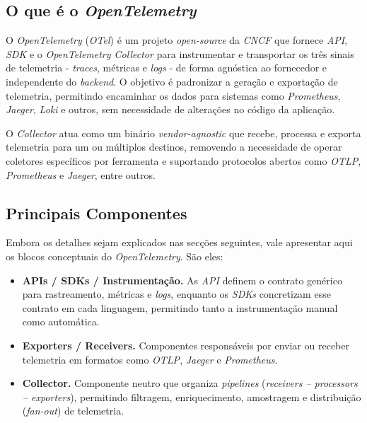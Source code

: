 \subsection{O que é o \textit{OpenTelemetry}}

O \textit{OpenTelemetry} (\textit{OTel}) é um projeto \textit{open-source} da \textit{CNCF} que fornece \textit{API}, \textit{SDK} e o \textit{OpenTelemetry Collector} para instrumentar e transportar os três sinais de telemetria - \textit{traces}, métricas e \textit{logs} - de forma agnóstica ao fornecedor e independente do \textit{backend}. O objetivo é padronizar a geração e exportação de telemetria, permitindo encaminhar os dados para sistemas como \textit{Prometheus}, \textit{Jaeger}, \textit{Loki} e outros, sem necessidade de alterações no código da aplicação.

O \textit{Collector} atua como um binário \textit{vendor-agnostic} que recebe, processa e exporta telemetria para um ou múltiplos destinos, removendo a necessidade de operar coletores específicos por ferramenta e suportando protocolos abertos como \textit{OTLP}, \textit{Prometheus} e \textit{Jaeger}, entre outros.


\subsection{Principais Componentes}

Embora os detalhes sejam explicados nas secções seguintes, vale apresentar aqui os blocos conceptuais do \textit{OpenTelemetry}. São eles:

\begin{itemize}
    \item \textbf{APIs / SDKs / Instrumentação.} As \textit{API} definem o contrato genérico para rastreamento, métricas e \textit{logs}, enquanto os \textit{SDKs} concretizam esse contrato em cada linguagem, permitindo tanto a instrumentação manual como automática.
    
    \item \textbf{Exporters / Receivers.} Componentes responsáveis por enviar ou receber telemetria em formatos como \textit{OTLP}, \textit{Jaeger} e \textit{Prometheus}.
    
    \item \textbf{Collector.} Componente neutro que organiza \textit{pipelines} (\textit{receivers -- processors -- exporters}), permitindo filtragem, enriquecimento, amostragem e distribuição (\textit{fan-out}) de telemetria.
\end{itemize}


